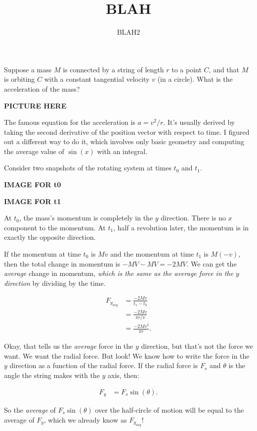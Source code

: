 \documentclass[18pt]{article} %
\title{BLAH}
\author{BLAH2}
\begin{document}
\maketitle

Suppose a mass $M$ is connected by a string of length $r$ to a point $C$, and
that $M$ is orbiting $C$ with a constant tangential velocity $v$ (in a circle).
What is the acceleration of the mass?

\textbf{PICTURE HERE}

The famous equation for the acceleration is $a = v^2/r$. It's usually
derived by taking the second derivative of the position vector with respect to
time. I figured out a different way to do it, which involves only basic geometry
and computing the average value of $\sin(x)$ with an integral. 

Consider two snapshots of the rotating system at times $t_0$ and $t_1$.


\textbf{IMAGE FOR t0}

\textbf{IMAGE FOR t1}

At $t_0$, the mass's momentum is completely in the $y$ direction. There is no
$x$ component to the momentum. At $t_1$, half a revolution later, the momentum
is in exactly the opposite direction. 

If the momentum at time $t_0$ is $Mv$ and the momentum at time $t_1$ is $M(-v)$,
then the total change in momentum is $-MV - MV = -2MV$. We can get the
\emph{average} change in momentum, \emph{which is the same as the average force
in the $y$ direction} by dividing by the time.

\begingroup
\Large
\begin{align*}
    F_{y_{avg}} &= \frac{-2Mv}{t_1 - t_0} \\
              &=\frac{-2Mv}{\pi r / v} \\
              &=\frac{-2Mv^2}{\pi r}.
\end{align*}
\endgroup

Okay, that tells us the \emph{average} force in the $y$ direction, but that's
not the force we want. We want the radial force. But look! We know how to write
the force in the $y$ direction as a function of the radial force. If the radial
force is $F_s$ and $\theta$ is the angle the string makes with the $y$ axis,
then:

\begingroup
\Large
\begin{align*}
    F_{y} &= F_s\sin(\theta).
\end{align*}
\endgroup

So the \emph{average} of $F_s\sin(\theta)$ over the half-circle of motion will
be equal to the average of $F_y$, which we already know as $F_{y_{avg}}$!
\end{document}
